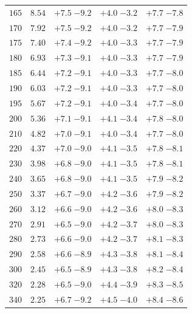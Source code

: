 \begin{table}
\begin{center}
\begin{tabular}{ccccc}
 $165 $&$  8.54 $& $ {+ 7.5}  \;{- 9.2} $ & $ {+ 4.0}  \;{- 3.2} $ & $ {+ 7.7}  \;{- 7.8} $ \\
 $170 $&$  7.92 $& $ {+ 7.5}  \;{- 9.2} $ & $ {+ 4.0}  \;{- 3.2} $ & $ {+ 7.7}  \;{- 7.9} $ \\
 $175 $&$  7.40 $& $ {+ 7.4}  \;{- 9.2} $ & $ {+ 4.0}  \;{- 3.3} $ & $ {+ 7.7}  \;{- 7.9} $ \\
 $180 $&$  6.93 $& $ {+ 7.3}  \;{- 9.1} $ & $ {+ 4.0}  \;{- 3.3} $ & $ {+ 7.7}  \;{- 7.9} $ \\
 $185 $&$  6.44 $& $ {+ 7.2}  \;{- 9.1} $ & $ {+ 4.0}  \;{- 3.3} $ & $ {+ 7.7}  \;{- 8.0} $ \\
 $190 $&$  6.03 $& $ {+ 7.2}  \;{- 9.1} $ & $ {+ 4.0}  \;{- 3.3} $ & $ {+ 7.7}  \;{- 8.0} $ \\
 $195 $&$  5.67 $& $ {+ 7.2}  \;{- 9.1} $ & $ {+ 4.0}  \;{- 3.4} $ & $ {+ 7.7}  \;{- 8.0} $ \\
 $200 $&$  5.36 $& $ {+ 7.1}  \;{- 9.1} $ & $ {+ 4.1}  \;{- 3.4} $ & $ {+ 7.8}  \;{- 8.0} $ \\
 $210 $&$  4.82 $& $ {+ 7.0}  \;{- 9.1} $ & $ {+ 4.0}  \;{- 3.4} $ & $ {+ 7.7}  \;{- 8.0} $ \\
 $220 $&$  4.37 $& $ {+ 7.0}  \;{- 9.0} $ & $ {+ 4.1}  \;{- 3.5} $ & $ {+ 7.8}  \;{- 8.1} $ \\
 $230 $&$  3.98 $& $ {+ 6.8}  \;{- 9.0} $ & $ {+ 4.1}  \;{- 3.5} $ & $ {+ 7.8}  \;{- 8.1} $ \\
 $240 $&$  3.65 $& $ {+ 6.8}  \;{- 9.0} $ & $ {+ 4.1}  \;{- 3.5} $ & $ {+ 7.9}  \;{- 8.2} $ \\
 $250 $&$  3.37 $& $ {+ 6.7}  \;{- 9.0} $ & $ {+ 4.2}  \;{- 3.6} $ & $ {+ 7.9}  \;{- 8.2} $ \\
 $260 $&$  3.12 $& $ {+ 6.6}  \;{- 9.0} $ & $ {+ 4.2}  \;{- 3.6} $ & $ {+ 8.0}  \;{- 8.3} $ \\
 $270 $&$  2.91 $& $ {+ 6.5}  \;{- 9.0} $ & $ {+ 4.2}  \;{- 3.7} $ & $ {+ 8.0}  \;{- 8.3} $ \\
 $280 $&$  2.73 $& $ {+ 6.6}  \;{- 9.0} $ & $ {+ 4.2}  \;{- 3.7} $ & $ {+ 8.1}  \;{- 8.3} $ \\
 $290 $&$  2.58 $& $ {+ 6.6}  \;{- 8.9} $ & $ {+ 4.3}  \;{- 3.8} $ & $ {+ 8.1}  \;{- 8.4} $ \\
 $300 $&$  2.45 $& $ {+ 6.5}  \;{- 8.9} $ & $ {+ 4.3}  \;{- 3.8} $ & $ {+ 8.2}  \;{- 8.4} $ \\
 $320 $&$  2.28 $& $ {+ 6.5}  \;{- 9.0} $ & $ {+ 4.4}  \;{- 3.9} $ & $ {+ 8.3}  \;{- 8.5} $ \\
 $340 $&$  2.25 $& $ {+ 6.7}  \;{- 9.2} $ & $ {+ 4.5}  \;{- 4.0} $ & $ {+ 8.4}  \;{- 8.6} $ \\

\end{tabular}
\end{center}
\end{table}
